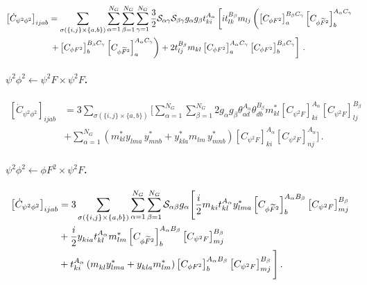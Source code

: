 \begin{align}
    \left[\dot C_{\psi^2\phi^2}\right]_{ijab} &= \sum_{\sigma(\{i,j\}\times\{a,b\})} \sum_{\alpha=1}^{N_G} \sum_{\beta=1}^{N_G}\sum_{\gamma=1}^{N_G}\frac{3}{2} \mathcal{S}_{\alpha\gamma} \mathcal{S}_{\beta\gamma}g_\alpha g_\beta t_{ki}^{A_\alpha} \left[  i t_{lk}^{B_\beta} m_{lj} \left(\left[C_{\phi F^2}\right]_{a}^{B_\beta C_\gamma} \left[C_{\phi \widetilde{F}^2}\right]_{b}^{A_\alpha C_\gamma}\right.\right.\nonumber\\
    &\left.\left.+ \left[C_{\phi F^2}\right]_{b}^{B_\beta C_\gamma} \left[C_{\phi \widetilde{F}^2}\right]_{a}^{A_\alpha C_\gamma}\right) +  2 t_{lj}^{B_\beta} m_{kl} \left[C_{\phi F^2}\right]_a^{A_\alpha C_\gamma} \left[C_{\phi F^2}\right]_b^{B_\beta C_\gamma}\right]\,.
\end{align}

\paragraph{$\psi^2\phi^2 \leftarrow \psi^2 F \times \psi^2 F$.}

\begin{align}
    \left[\dot C_{\psi^2\phi^2}\right]_{ijab} &= 3\sum_{\sigma(\{i,j\}\times\{a,b\})} \Bigg[\sum_{\alpha=1}^{N_G} \sum_{\beta=1}^{N_G} 2 g_\alpha g_\beta \theta^{A_\alpha}_{ad}\theta^{B_\beta}_{db} m_{kl}^* \left[C_{\psi^2 F}\right]_{ki}^{A_\alpha}\left[C_{\psi^2 F}\right]_{lj}^{B_\beta}\nonumber\\
    & +\sum_{\alpha=1}^{N_G} \left(m_{kl}^{*} y_{lma}^{\phantom *} \, y^*_{mnb}+y_{kla}^{*} m_{lm}^{\phantom *} \, y^*_{mnb}\right) \left[C_{\psi^2 F}\right]_{ki}^{A_\alpha}\left[C_{\psi^2 F}\right]_{nj}^{A_\alpha}\Bigg]\,. 
\end{align}

\paragraph{$\psi^2\phi^2 \leftarrow \phi F^2 \times \psi^2 F$.}

\begin{align}
    \left[\dot C_{\psi^2\phi^2}\right]_{ijab} &= 3\sum_{\sigma(\{i,j\}\times\{a,b\})} \sum_{\alpha=1}^{N_G}\sum_{\beta=1}^{N_G} \mathcal{S}_{\alpha\beta} g_\alpha\Bigg[\frac{i}{2} m_{ki}^{\phantom *} t_{kl}^{A_\alpha} y_{lma}^* \left[C_{\phi \tildee F^2}\right]_{b}^{A_\alpha B_\beta}\left[C_{\psi^2 F}\right]_{mj}^{B_\beta}\nonumber\\
    &+ \frac{i}{2} y_{kia}^{\phantom *} t_{kl}^{A_\alpha} m_{lm}^* \left[C_{\phi \tildee F^2}\right]_{b}^{A_\alpha B_\beta}\left[C_{\psi^2 F}\right]_{mj}^{B_\beta}\nonumber\\
    &+ t_{ki}^{A_\alpha} \left(m_{kl}^{\phantom *} y_{lma}^* +y_{kla}^{\phantom *} m_{lm}^* \right)\left[C_{\phi F^2}\right]_{b}^{A_\alpha B_\beta}\left[C_{\psi^2 F}\right]_{mj}^{B_\beta}\Bigg]\,.
\end{align}

